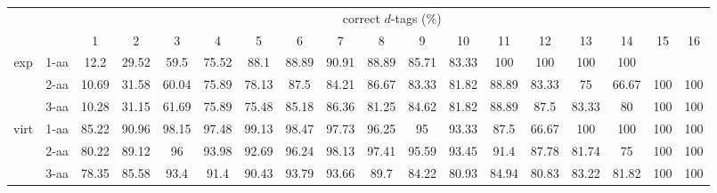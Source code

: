 \begin{table}[h]\tiny
\vspace{3mm}
{\centering
\begin{center}
\begin{tabular}{|c|l|c|c|c|c|c|c|c|c|c|c|c|c|c|c|c|c|}
  \hline
  \multicolumn{2}{|c|}{ } & \multicolumn{ 16 }{|c|}{ correct $d$-tags (\%)} \\
  \cline{3- 18}
  \multicolumn{2}{|c|}{ }  & 1 & 2 & 3 & 4 & 5 & 6 & 7 & 8 & 9 & 10 & 11 & 12 & 13 & 14 & 15 & 16\\
  \hline
  \multirow{3}{*}{exp}
&  1-aa  & 12.2 & 29.52 & 59.5 & 75.52 & 88.1 & 88.89 & 90.91 & 88.89 & 85.71 & 83.33 & 100 & 100 & 100 & 100 &  & \\
&  2-aa  & 10.69 & 31.58 & 60.04 & 75.89 & 78.13 & 87.5 & 84.21 & 86.67 & 83.33 & 81.82 & 88.89 & 83.33 & 75 & 66.67 & 100 & 100\\
&  3-aa  & 10.28 & 31.15 & 61.69 & 75.89 & 75.48 & 85.18 & 86.36 & 81.25 & 84.62 & 81.82 & 88.89 & 87.5 & 83.33 & 80 & 100 & 100\\
 \hline
  \multirow{3}{*}{virt} 
&  1-aa  & 85.22 & 90.96 & 98.15 & 97.48 & 99.13 & 98.47 & 97.73 & 96.25 & 95 & 93.33 & 87.5 & 66.67 & 100 & 100 & 100 & 100\\
&  2-aa  & 80.22 & 89.12 & 96 & 93.98 & 92.69 & 96.24 & 98.13 & 97.41 & 95.59 & 93.45 & 91.4 & 87.78 & 81.74 & 75 & 100 & 100\\
&  3-aa  & 78.35 & 85.58 & 93.4 & 91.4 & 90.43 & 93.79 & 93.66 & 89.7 & 84.22 & 80.93 & 84.94 & 80.83 & 83.22 & 81.82 & 100 & 100\\
 \hline
\end{tabular}
\end{center}
\par}
\centering

\vspace{3mm}
\label{table:correct-vs-proper-d-tags}
\end{table}
